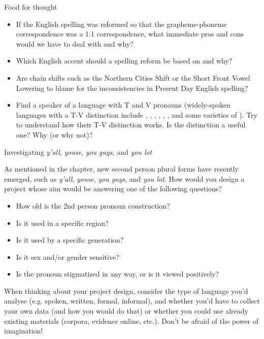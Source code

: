 \begin{exercises}{Food for thought}
\begin{itemize}
    \item If the English spelling was reformed so that the grapheme-phoneme correspondence was a 1:1 correspondence, what immediate pros and cons would we have to deal with and why?
    \item Which English accent should a spelling reform be based on and why?
    \item Are chain shifts such as the Northern Cities Shift or the Short Front Vowel Lowering to blame for the inconsistencies in Present Day English spelling?
    \item Find a speaker of a language with T and V pronouns (widely-spoken languages with a T-V distinction include , , , , , , and some varieties of ). Try to understand how their T-V distinction works. Is the distinction a useful one? Why (or why not)?
\end{itemize}

\end{exercises}

\begin{exercises}{Investigating \textit{y'all}, \textit{youse}, \textit{you guys}, and \textit{you lot}}
\chili{}

As mentioned in the chapter, new second person plural forms have recently emerged, such as \textit{y'all}, \textit{youse}, \textit{you guys}, and \textit{you lot}. How would you design a project whose aim would be answering one of the following questions?
\begin{itemize}
    \item How old is the 2nd person pronoun construction?
    \item Is it used in a specific region?
    \item Is it used by a specific generation?
    \item Is it sex and/or gender sensitive?
    \item Is the pronoun stigmatized in any way, or is it viewed positively?
\end{itemize}

\noindent When thinking about your project design, consider the type of language you'd analyse (e.g. spoken, written, formal, informal), and whether you'd have to collect your own data (and how you would do that) or whether you could use already existing materials (corpora, evidence online, etc.). Don't be afraid of the power of imagination!
\end{exercises}

